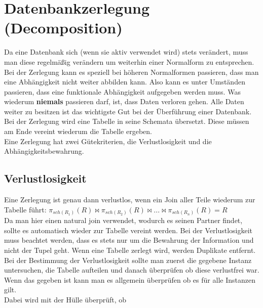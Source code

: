 \documentclass{article}
\begin{document}
	\section{Datenbankzerlegung (Decomposition)}
	Da eine Datenbank sich (wenn sie aktiv verwendet wird) stets verändert, muss man diese regelmäßig verändern um weiterhin einer Normalform zu entsprechen.
	Bei der Zerlegung kann es speziell bei höheren Normalformen passieren, dass man eine Abhängigkeit nicht weiter abbilden kann. Also kann es unter Umständen passieren, dass eine funktionale Abhängigkeit aufgegeben werden muss. Was wiederum \textbf{niemals} passieren darf, ist, dass Daten verloren gehen. Alle Daten weiter zu besitzen ist das wichtigste Gut bei der Überführung einer Datenbank. \\
	Bei der Zerlegung wird eine Tabelle in seine Schemata übersetzt. Diese müssen am Ende vereint wiederum die Tabelle ergeben. \\
	Eine Zerlegung hat zwei Gütekriterien, die Verlustlosigkeit und die Abhängigkeitsbewahrung. \\
	\subsection{Verlustlosigkeit}
	Eine Zerlegung ist genau dann verlustlos, wenn ein Join aller Teile wiederum zur Tabelle führt: $\pi_{sch(R_1)}(R)\bowtie\pi_{sch(R_2)}(R)\bowtie ... \bowtie\pi_{sch(R_n)}(R)=R$ \\
	Da man hier einen natural join verwendet, wodurch es seinen Partner findet, sollte es automatisch wieder zur Tabelle vereint werden. Bei der Verlustlosigkeit muss beachtet werden, dass es stets nur um die Bewahrung der Information und nicht der Tupel geht. Wenn eine Tabelle zerlegt wird, werden Duplikate entfernt. \\
	Bei der Bestimmung der Verlustlosigkeit sollte man zuerst die gegebene Instanz untersuchen, die Tabelle aufteilen und danach überprüfen ob diese verlustfrei war. Wenn das gegeben ist kann man es allgemein überprüfen ob es für alle Instanzen gilt. \\
	Dabei wird mit der Hülle überprüft, ob
\end{document}
